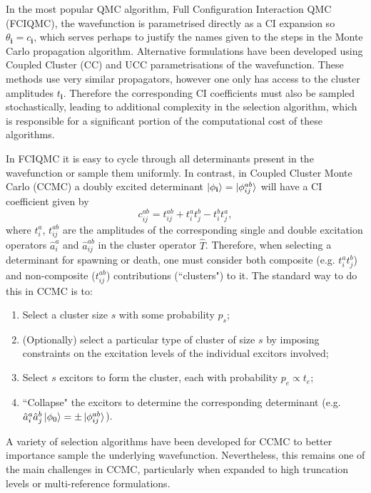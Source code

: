 \documentclass[%
 reprint,
 amsmath,amssymb,
 aps,
]{revtex4-2}
\begin{document}
In the most popular QMC algorithm, Full Configuration Interaction QMC (FCIQMC),\cite{Booth2009} the wavefunction is parametrised directly as a CI expansion so $\theta_\mathbf{i} = c_\mathbf{i}$, which serves perhaps to justify the names given to the steps in the Monte Carlo propagation algorithm. Alternative formulations have been developed using Coupled Cluster (CC)\cite{Thom2010} and UCC\cite{Filip2020} parametrisations of the wavefunction. These methods use very similar propagators, however  one only has access to the cluster amplitudes $t_\mathbf{i}$. Therefore the corresponding CI coefficients must also be sampled stochastically, leading to additional complexity in the selection algorithm, which is responsible for a significant portion of the computational cost of these algorithms. 

In FCIQMC it is easy to cycle through all determinants present in the wavefunction or sample them uniformly. In contrast, in Coupled Cluster Monte Carlo (CCMC) a doubly excited determinant $\ket{\phi_\mathbf{i}} = \ket{\phi_{ij}^{ab}}$ will have a CI coefficient given by
\begin{equation}
    c_{ij}^{ab} = t_{ij}^{ab} + t_{i}^at_j^b - t_i^bt_j^a,
\end{equation}
where $t_{i}^a$, $t_{ij}^{ab}$ are the amplitudes of the corresponding single and double excitation operators $\hat a_i^a$ and $\hat a_{ij}^{ab}$ in the cluster operator $\hat T$. Therefore, when selecting a determinant for spawning or death, one must consider both composite (e.g. $t_{i}^at_j^b$) and non-composite ($t_{ij}^{ab}$) contributions (``clusters") to it. The standard way to do this in CCMC\cite{Thom2010, Scott2017} is to:
\begin{enumerate}
    \item Select a cluster size $s$ with some probability $p_s$;
    \item (Optionally) select a particular type of cluster of size $s$ by imposing constraints on the excitation levels of the individual excitors involved;\cite{Scott2017}
    \item Select $s$ excitors to form the cluster, each with probability $p_e \propto t_e$;
    \item ``Collapse" the excitors to determine the corresponding determinant (e.g. $\hat a_i^a \hat a_j^b \ket{\phi_0} = \pm\ket{\phi_{ij}^{ab}}$).
\end{enumerate}

A variety of selection algorithms have been developed for CCMC  to better importance sample the underlying wavefunction.\cite{Scott2017} Nevertheless, this remains one of the main challenges in CCMC, particularly when expanded to high truncation levels\cite{Neufeld2017} or multi-reference formulations.\cite{Filip2019} 
\end{document}
